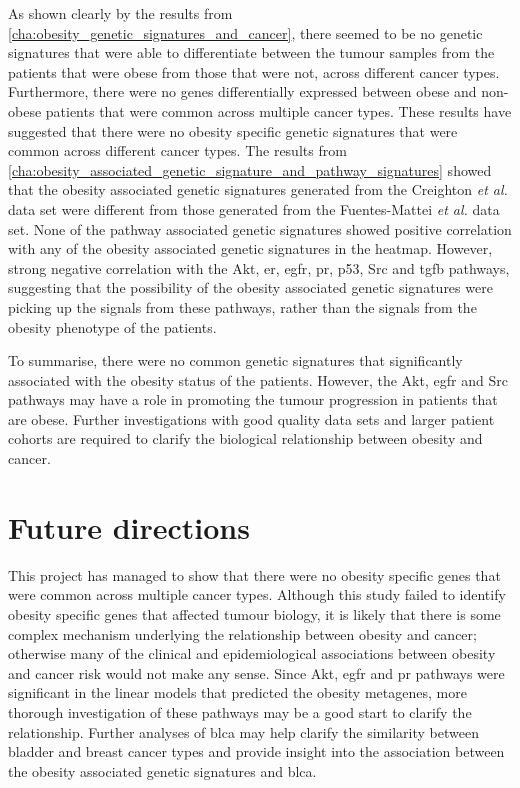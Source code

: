 As shown clearly by the results from \cref{cha:obesity_genetic_signatures_and_cancer}, there seemed to be no  genetic signatures that were able to differentiate between the tumour samples from the patients that were obese from those that were not, across different cancer types.
Furthermore, there were no genes differentially expressed between obese and non-obese patients that were common across multiple cancer types.
These results have suggested that there were no obesity specific genetic signatures that were common across different cancer types.
The results from \cref{cha:obesity_associated_genetic_signature_and_pathway_signatures} showed that the obesity associated genetic signatures generated from the Creighton \textit{et al.} data set were different from those generated from the Fuentes-Mattei \textit{et al.} data set.
None of the pathway associated genetic signatures showed positive correlation with any of the obesity associated genetic signatures in the heatmap.
However, strong negative correlation with the Akt, \gls{er}, \gls{egfr}, \gls{pr}, p53, Src and \gls{tgfb} pathways, suggesting that the possibility of the obesity associated genetic signatures were picking up the signals from these pathways, rather than the signals from the obesity phenotype of the patients.

To summarise, there were no common genetic signatures that significantly associated with the obesity status of the patients.
However, the Akt, \gls{egfr} and Src pathways may have a role in promoting the tumour progression in patients that are obese.
Further investigations with good quality data sets and larger patient cohorts are required to clarify the biological relationship between obesity and cancer.

\section{Future directions}
\label{sec:future_directions}

This project has managed to show that there were no obesity specific genes  that were common across multiple cancer types.
Although this study failed to identify obesity specific genes that affected tumour biology, it is likely that there is some complex mechanism underlying the relationship between obesity and cancer; otherwise many of the clinical and epidemiological associations between obesity and cancer risk would not make any sense.
Since Akt, \gls{egfr} and \gls{pr} pathways were significant in the linear models that predicted the obesity metagenes, more thorough investigation of these pathways may be a good start to clarify the relationship.
Further analyses of \gls{blca} may help clarify the similarity between bladder and breast cancer types and provide insight into the association between the obesity associated genetic signatures and \gls{blca}.

